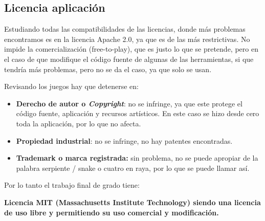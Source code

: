 \subsection{Licencia aplicación}
Estudiando todas las compatibilidades de las licencias, donde más problemas encontramos es en la licencia Apache 2.0, ya que es de las más restrictivas. No impide la comercialización (free-to-play), que es justo lo que se pretende, pero en el caso de que modifique el código fuente de algunas de las herramientas, si que tendría más problemas, pero no se da el caso, ya que solo se usan.

Revisando los juegos hay que detenerse en:

\begin{itemize}
	\item \textbf{Derecho de autor o \emph{Copyright}}: no se infringe, ya que este protege el código fuente, aplicación y recursos artísticos. En este caso se hizo desde cero toda la aplicación, por lo que no afecta.
	\item \textbf{Propiedad industrial}: no se infringe, no hay patentes encontradas. 
	\item \textbf{Trademark o marca registrada:} sin problema, no se puede apropiar de la palabra serpiente / snake o cuatro en raya, por lo que se puede llamar así.
\end{itemize}

Por lo tanto el trabajo final de grado tiene:
 						
\textbf{Licencia MIT (Massachusetts Institute Technology) siendo una licencia de uso libre y permitiendo su uso comercial y modificación.}




